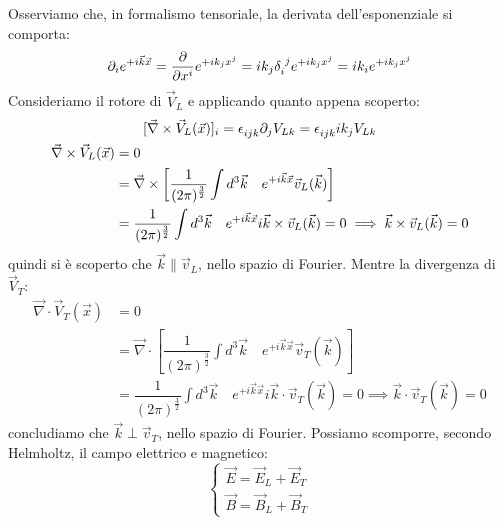 Osserviamo che, in formalismo tensoriale, la derivata dell'esponenziale si comporta:
\begin{equation*}
    \begin{split}
        \partial_i e^{+i\Vec{k}\Vec{x}}=\dfrac{\partial}{\partial x^i} e^{+ik_jx^j} =ik_j \delta\indices{_i^j} e^{+ik_jx^j}=ik_ie^{+ik_jx^j}
    \end{split}
\end{equation*}
Consideriamo il rotore di $\Vec{V}_L$ e applicando quanto appena scoperto:
\begin{equation}
\begin{gathered}
[\Vec{\nabla}\times \Vec{V}_L(\Vec{x})]_i=\epsilon\indices{_{ijk}}\partial_j V_{Lk}    =\epsilon\indices{_{ijk}}ik_jV_{Lk}  \\
    \begin{aligned}
   \Vec{\nabla}\times \Vec{V}_L(\Vec{x})&=0\\
   &=\Vec{\nabla}\times\left[\dfrac{1}{(2\pi)^\frac{3}{2}} \int d^3\Vec{k} \quad e^{+i\Vec{k}\Vec{x}}\Vec{v}_L(\Vec{k})\right]\\
&=\dfrac{1}{(2\pi)^\frac{3}{2}} \int d^3\Vec{k}\quad e^{+i\Vec{k}\Vec{x}}i\Vec{k}\times\Vec{v}_L(\Vec{k})=0
\implies\Vec{k}\times\Vec{v}_L(\Vec{k})=0
   \end{aligned}
\end{gathered}
\end{equation}
quindi si è scoperto che $\Vec{k}\parallel\Vec{v}_L$, nello spazio di Fourier. Mentre la divergenza di $\Vec{V}_T$:
\begin{equation}
   \begin{split}
         \Vec{\nabla}\cdot \Vec{V}_T(\Vec{x})&=0\\
   &=\Vec{\nabla}\cdot\left[\dfrac{1}{(2\pi)^\frac{3}{2}} \int d^3\Vec{k} \quad e^{+i\Vec{k}\Vec{x}}\Vec{v}_T(\Vec{k})\right]\\
&=\dfrac{1}{(2\pi)^\frac{3}{2}} \int d^3\Vec{k}\quad e^{+i\Vec{k}\Vec{x}}i\Vec{k}\cdot\Vec{v}_T(\Vec{k})=0 \implies\Vec{k}\cdot\Vec{v}_T(\Vec{k})=0
   \end{split}
\end{equation}
concludiamo che $\Vec{k}\perp\Vec{v}_T$, nello spazio di Fourier.
Possiamo scomporre, secondo Helmholtz, il campo elettrico e magnetico:
\begin{equation}
\begin{cases}
  \Vec{E}=\Vec{E}_L+\Vec{E}_T\\
  \Vec{B}=\Vec{B}_L+\Vec{B}_T
\end{cases}
\end{equation}
